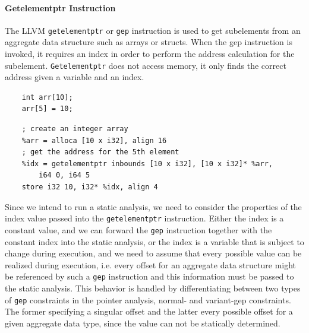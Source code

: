 \paragraph{Getelementptr Instruction}
The LLVM \verb|getelementptr| or \verb|gep| instruction is used to get subelements from an aggregate data structure such as arrays or structs. When the gep instruction is invoked, it requires an index in order to perform the address calculation for the subelement. \verb|Getelementptr| does not access memory, it only finds the correct address given a variable and an index.
\begin{verbatim}
    int arr[10];
    arr[5] = 10;
\end{verbatim}
\begin{verbatim}
    ; create an integer array
    %arr = alloca [10 x i32], align 16
    ; get the address for the 5th element
    %idx = getelementptr inbounds [10 x i32], [10 x i32]* %arr, 
        i64 0, i64 5
    store i32 10, i32* %idx, align 4
\end{verbatim}
Since we intend to run a static analysis, we need to consider the properties of the index value passed into the \verb|getelementptr| instruction.
Either the index is a constant value, and we can forward the \verb|gep| instruction together with the constant index into the static analysis,
or the index is a variable that is subject to change during execution, and we need to assume that every possible value can be realized during execution, i.e. every offset for an aggregate data structure might be referenced by such a \verb|gep| instruction and this information must be passed to the static analysis.
This behavior is handled by differentiating between two types of \verb|gep| constraints in the pointer analysis, normal- and variant-gep constraints. The former specifying a singular offset and the latter every possible offset for a given aggregate data type, since the value can not be statically determined.

